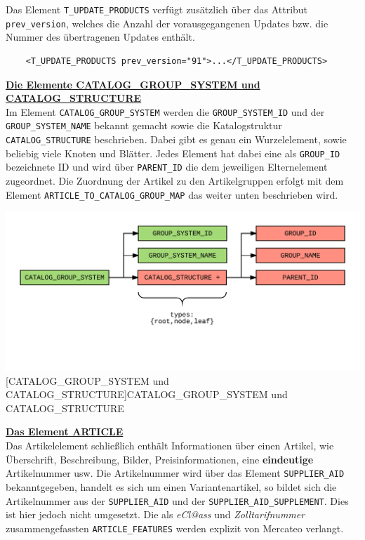 	Das Element \texttt{T\_UPDATE\_PRODUCTS} verfügt zusätzlich über das Attribut \texttt{prev\_version}, welches die Anzahl der vorausgegangenen Updates bzw. die Nummer des übertragenen Updates enthält. 
	
	\begin{lstlisting}
	<T_UPDATE_PRODUCTS prev_version="91">...</T_UPDATE_PRODUCTS>
	\end{lstlisting}
	
	
	
	\textbf{\underline{Die Elemente CATALOG\_GROUP\_SYSTEM und CATALOG\_STRUCTURE}}\\
	
	Im Element \texttt{CATALOG\_GROUP\_SYSTEM} werden die \texttt{GROUP\_SYSTEM\_ID} und der \texttt{GROUP\_SYSTEM\_NAME} bekannt gemacht sowie die Katalogstruktur  \texttt{CATALOG\_STRUCTURE}   beschrieben. Dabei gibt es genau ein Wurzelelement, sowie beliebig viele Knoten und Blätter. Jedes Element hat dabei eine als \texttt{GROUP\_ID} bezeichnete ID und wird über \texttt{PARENT\_ID} die  dem jeweiligen Elternelement zugeordnet. Die Zuordnung der Artikel zu den Artikelgruppen erfolgt mit dem Element \texttt{ARTICLE\_TO\_CATALOG\_GROUP\_MAP} das weiter unten beschrieben wird.
	
	\begin{minipage}{\linewidth}
		\vspace{1em}
		\centering
		\includegraphics[width=0.6\linewidth]{img/catalogGroupSystem}
		[CATALOG\_GROUP\_SYSTEM und CATALOG\_STRUCTURE]{CATALOG\_GROUP\_SYSTEM und CATALOG\_STRUCTURE}
		\label{fig:header}
		\vspace{1em}
	\end{minipage} 
	
	\textbf{\underline{Das Element ARTICLE}}\\
	Das Artikelelement schließlich enthält Informationen über einen Artikel, wie Überschrift, Beschreibung, Bilder, Preisinformationen, eine \textbf{eindeutige} Artikelnummer usw. Die Artikelnummer wird über das Element \texttt{SUPPLIER\_AID} bekanntgegeben, handelt es sich um einen Variantenartikel, so bildet sich die Artikelnummer aus der \texttt{SUPPLIER\_AID} und der \texttt{SUPPLIER\_AID\_SUPPLEMENT}. Dies ist hier jedoch nicht umgesetzt. Die als \textit{eCl@ass} und \textit{Zolltarifnummer} zusammengefassten \texttt{ARTICLE\_FEATURES} werden explizit von Mercateo verlangt.
	
